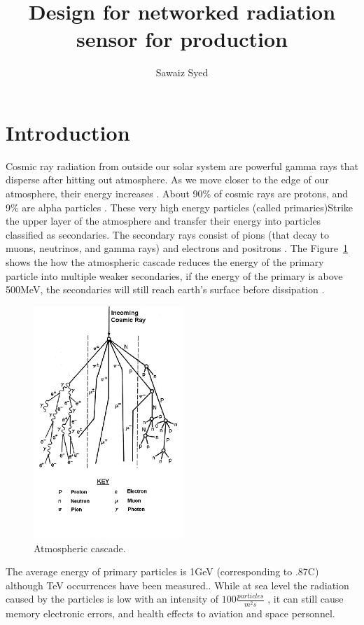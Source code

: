 \documentclass[10pt]{article}
\author{Sawaiz Syed}
\title{Design for networked radiation sensor for production}
\begin{document}
\maketitle

\section{Introduction}
Cosmic ray radiation from outside our solar system are powerful gamma rays that disperse 
after hitting out atmosphere. As we move closer to the edge of our atmosphere, their 
energy increases \cite{Nave}. About 90\% of cosmic rays are protons, and 9\% 
are alpha particles \cite{Nave}. These very high energy particles (called 
primaries)Strike the upper layer of the atmosphere and transfer their energy into 
particles classified as secondaries. The secondary rays consist of pions (that decay 
to muons, neutrinos, and gamma rays) and electrons and positrons \cite{Mewaldt1996}. The 
Figure~\ref{fig:atmosphericCascade} shows the how the atmospheric cascade reduces the energy of 
the primary particle into multiple weaker secondaries, if the energy of the primary 
is above 500MeV, the secondaries will still reach earth's surface before dissipation 
\cite{Bieber2000}. 

\begin{figure}[h]
	\centering
    \includegraphics[width=0.5\textwidth]{atmosphericCascade.png}
    \caption{Atmospheric cascade.}
    \label{fig:atmosphericCascade}
\end{figure}

The average energy of primary particles is 1GeV (corresponding to .87C) 
although TeV occurrences have been measured.\cite{Nave}. While at sea level the 
radiation caused by the particles is low with an intensity of $100 \frac{particles}{m^2s}$ 
\cite{Mewaldt1996}, it can still cause memory electronic errors, and health effects to 
aviation \cite{Friedberg2000} and space personnel.
\end{document}
